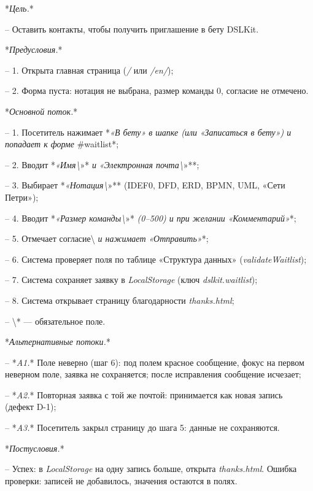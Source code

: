 \documentclass[a4paper,14pt]{extarticle}
\begin{document}
*\textit{Цель.}*


– Оставить контакты, чтобы получить приглашение в бету DSLKit.



*\textit{Предусловия.}*


– 1. Открыта главная страница (\textit{/} или \textit{/en/});

– 2. Форма пуста: нотация не выбрана, размер команды 0, согласие не отмечено.



*\textit{Основной поток.}*


– 1. Посетитель нажимает *\textit{«В бету»}\textit{ в шапке (или }\textit{«Записаться в бету»}\textit{) и попадает к форме }\#waitlist*;

– 2. Вводит *\textit{«Имя\textbackslash{}}»*\textit{ и }\textit{«Электронная почта\textbackslash{}}»**;

– 3. Выбирает *\textit{«Нотация\textbackslash{}}»** (IDEF0, DFD, ERD, BPMN, UML, «Сети Петри»);

– 4. Вводит *\textit{«Размер команды\textbackslash{}}»*\textit{ (0–500) и при желании }\textit{«Комментарий»}*;

– 5. Отмечает согласие\textbackslash{}\textit{ и нажимает }\textit{«Отправить»}*;

– 6. Система проверяет поля по таблице «Структура данных» (\textit{validateWaitlist});

– 7. Система сохраняет заявку в \textit{LocalStorage} (ключ \textit{dslkit.waitlist});

– 8. Система открывает страницу благодарности \textit{thanks.html};

– \textbackslash{}* — обязательное поле.



*\textit{Альтернативные потоки.}*


– *\textit{A1.}* Поле неверно (шаг 6): под полем красное сообщение, фокус на первом неверном поле, заявка не сохраняется; после исправления сообщение исчезает;

– *\textit{A2.}* Повторная заявка с той же почтой: принимается как новая запись (дефект D-1);

– *\textit{A3.}* Посетитель закрыл страницу до шага 5: данные не сохраняются.



*\textit{Постусловия.}*


– Успех: в \textit{LocalStorage} на одну запись больше, открыта \textit{thanks.html}. Ошибка проверки: записей не добавилось, значения остаются в полях.
\end{document}
